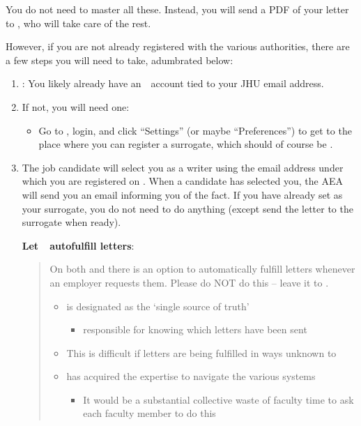 \documentclass{\econtex}
\begin{document}
You do not need to master all these. Instead, you will send a PDF of your letter to {\JMStaffName}, who will take care of the rest.

However, if you are not already registered with the various authorities, there are a few steps you will need to take, adumbrated below:

\begin{enumerate}

\item \textbf{\AEAref}:
  You likely already have an~{\AEAref}~account tied to your JHU email address.

\item   If not, you will need one:
  \begin{itemize}
  \item Go to \AEALink, login, and click ``Settings'' (or maybe ``Preferences'') to get to the place where you can register a surrogate, which should of course be \jmstaffemail.
  \end{itemize}
  

\item  The job candidate will select you as a writer using the email address under which you are registered on \AEALink.  When a candidate has selected you, the AEA will send you an email informing you of the fact.  If you have already set {\JMStaffName} as your surrogate, you do not need to do anything (except send the letter to the surrogate when ready).

  \hypertarget{let-jmstaff-fulfill-letters}{}

  \textbf{Let~{\JMStaffName}~autofulfill letters}:
  \begin{quote}
    On both {\EJM} and {\AEAref} there is an option to automatically fulfill letters whenever an employer requests them. Please do NOT do this -- leave it to {\JMStaffName}.
    \begin{itemize}
    \item {\JMStaffName} is designated as the `single source of truth' 
      \begin{itemize}
      \item responsible for knowing which letters have been sent
      \end{itemize}
    \item This is difficult if letters are being fulfilled in ways unknown to {\JMStaffName}
    \item {\JMStaffName} has acquired the expertise to navigate the various systems
      \begin{itemize}
      \item It would be a substantial collective waste of faculty time to ask each faculty member to do this
      \end{itemize}
    \end{itemize}
  \end{quote}
  

\end{enumerate}
\end{document}
